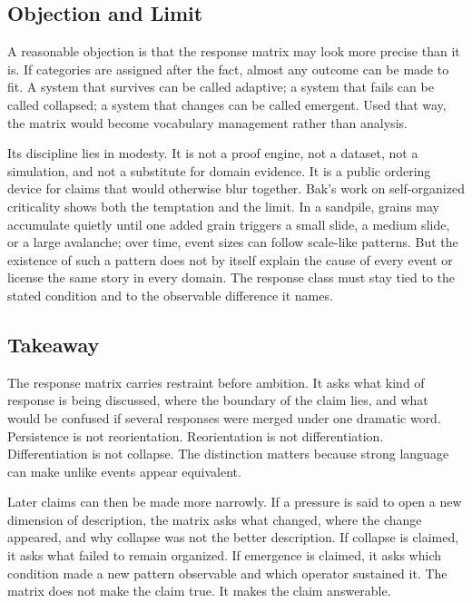 \documentclass[11pt,a4paper,openany]{book}
\begin{document}
\subsection{Objection and Limit}
A reasonable objection is that the response matrix may look more precise than it is. If categories are assigned after the fact, almost any outcome can be made to fit. A system that survives can be called adaptive; a system that fails can be called collapsed; a system that changes can be called emergent. Used that way, the matrix would become vocabulary management rather than analysis. \cite{nicolis_prigogine_selforg,kauffman_autocatalytic}\par
Its discipline lies in modesty. It is not a proof engine, not a dataset, not a simulation, and not a substitute for domain evidence. It is a public ordering device for claims that would otherwise blur together. Bak's work on self-organized criticality shows both the temptation and the limit. In a sandpile, grains may accumulate quietly until one added grain triggers a small slide, a medium slide, or a large avalanche; over time, event sizes can follow scale-like patterns. But the existence of such a pattern does not by itself explain the cause of every event or license the same story in every domain. The response class must stay tied to the stated condition and to the observable difference it names.\par
\subsection{Takeaway}
The response matrix carries restraint before ambition. It asks what kind of response is being discussed, where the boundary of the claim lies, and what would be confused if several responses were merged under one dramatic word. Persistence is not reorientation. Reorientation is not differentiation. Differentiation is not collapse. The distinction matters because strong language can make unlike events appear equivalent. \cite{nicolis_prigogine_selforg,kauffman_autocatalytic}\par
Later claims can then be made more narrowly. If a pressure is said to open a new dimension of description, the matrix asks what changed, where the change appeared, and why collapse was not the better description. If collapse is claimed, it asks what failed to remain organized. If emergence is claimed, it asks which condition made a new pattern observable and which operator sustained it. The matrix does not make the claim true. It makes the claim answerable.\par
\end{document}
